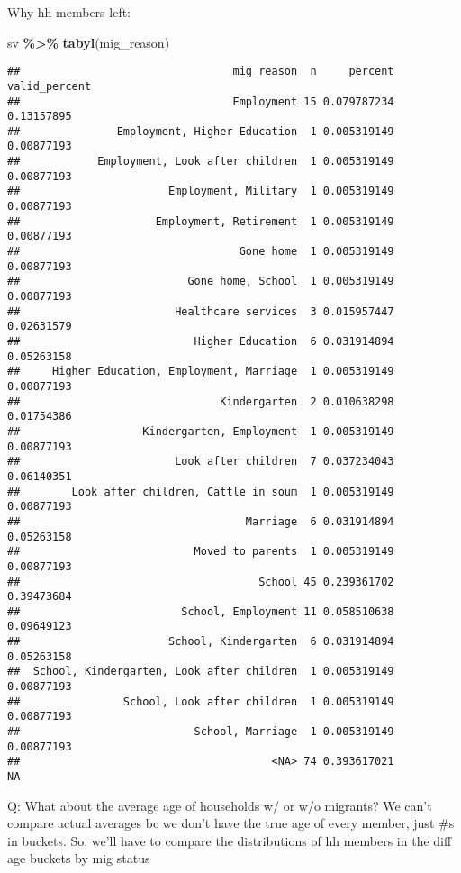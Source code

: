 \documentclass[
]{article}
\newenvironment{Shaded}{\begin{snugshade}}{\end{snugshade}}
\newcommand{\FunctionTok}[1]{\textcolor[rgb]{0.13,0.29,0.53}{\textbf{#1}}}
\newcommand{\NormalTok}[1]{#1}
\newcommand{\SpecialCharTok}[1]{\textcolor[rgb]{0.81,0.36,0.00}{\textbf{#1}}}
\begin{document}
Why hh members left:

\begin{Shaded}
\begin{Highlighting}[]
\NormalTok{sv }\SpecialCharTok{\%\textgreater{}\%} \FunctionTok{tabyl}\NormalTok{(mig\_reason)}
\end{Highlighting}
\end{Shaded}

\begin{verbatim}
##                                 mig_reason  n     percent valid_percent
##                                 Employment 15 0.079787234    0.13157895
##               Employment, Higher Education  1 0.005319149    0.00877193
##            Employment, Look after children  1 0.005319149    0.00877193
##                       Employment, Military  1 0.005319149    0.00877193
##                     Employment, Retirement  1 0.005319149    0.00877193
##                                  Gone home  1 0.005319149    0.00877193
##                          Gone home, School  1 0.005319149    0.00877193
##                        Healthcare services  3 0.015957447    0.02631579
##                           Higher Education  6 0.031914894    0.05263158
##     Higher Education, Employment, Marriage  1 0.005319149    0.00877193
##                               Kindergarten  2 0.010638298    0.01754386
##                   Kindergarten, Employment  1 0.005319149    0.00877193
##                        Look after children  7 0.037234043    0.06140351
##        Look after children, Cattle in soum  1 0.005319149    0.00877193
##                                   Marriage  6 0.031914894    0.05263158
##                           Moved to parents  1 0.005319149    0.00877193
##                                     School 45 0.239361702    0.39473684
##                         School, Employment 11 0.058510638    0.09649123
##                       School, Kindergarten  6 0.031914894    0.05263158
##  School, Kindergarten, Look after children  1 0.005319149    0.00877193
##                School, Look after children  1 0.005319149    0.00877193
##                           School, Marriage  1 0.005319149    0.00877193
##                                       <NA> 74 0.393617021            NA
\end{verbatim}

Q: What about the average age of households w/ or w/o migrants? We can't
compare actual averages bc we don't have the true age of every member,
just \#s in buckets. So, we'll have to compare the distributions of hh
members in the diff age buckets by mig status
\end{document}
